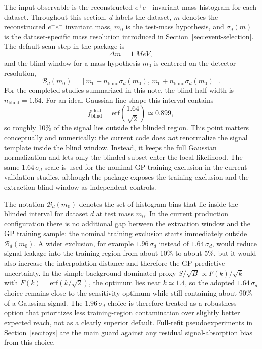 The input observable is the reconstructed $e^+e^-$ invariant-mass histogram for each
dataset. Throughout this section, $d$ labels the dataset, $m$ denotes the reconstructed
$e^+e^-$ invariant mass, $m_0$ is the test-mass hypothesis, and $\sigma_d(m)$ is the
dataset-specific mass resolution introduced in
Section~\ref{sec:event-selection}. The default scan step in the package is
\begin{equation}
\Delta m = \SI{1}{MeV},
\end{equation}
and the blind window for a mass hypothesis $m_0$ is centered on the detector
resolution,
\begin{equation}
\mathcal{B}_d(m_0) =
\left[m_0 - n_{\mathrm{blind}}\sigma_d(m_0),\,
      m_0 + n_{\mathrm{blind}}\sigma_d(m_0)\right].
\end{equation}
For the completed studies summarized in this note, the blind half-width is
$n_{\mathrm{blind}}=1.64$. For an ideal Gaussian line shape this interval contains
\begin{equation}
f_{\mathrm{blind}}^{\mathrm{ideal}}
= \mathrm{erf}\!\left(\frac{1.64}{\sqrt{2}}\right)
\simeq 0.899,
\end{equation}
so roughly 10\% of the signal lies outside the blinded region. This point matters
conceptually and numerically: the current code does \emph{not} renormalize the signal
template inside the blind window. Instead, it keeps the full Gaussian normalization and
lets only the blinded subset enter the local likelihood. The same $1.64\,\sigma_d$
scale is used for the nominal GP training exclusion in the current validation studies,
although the package exposes the training exclusion and the extraction blind window as
independent controls.

The notation $\mathcal{B}_d(m_0)$ denotes the set of histogram bins that lie inside the
blinded interval for dataset $d$ at test mass $m_0$. In the current production
configuration there is no additional gap between the extraction window and the GP
training sample: the nominal training exclusion starts immediately outside
$\mathcal{B}_d(m_0)$. A wider exclusion, for example $1.96\,\sigma_d$ instead of
$1.64\,\sigma_d$, would reduce signal leakage into the training region from about 10\%
to about 5\%, but it would also increase the interpolation distance and therefore the
GP predictive uncertainty. In the simple background-dominated proxy
$S/\sqrt{B}\propto F(k)/\sqrt{k}$ with $F(k)=\mathrm{erf}(k/\sqrt{2})$, the optimum lies
near $k\simeq1.4$, so the adopted $1.64\,\sigma_d$ choice remains close to the
sensitivity optimum while still containing about 90\% of a Gaussian signal. The
$1.96\,\sigma_d$ choice is therefore treated as a robustness option that prioritizes
less training-region contamination over slightly better expected reach, not as a
clearly superior default. Full-refit pseudoexperiments in Section~\ref{sec:toys} are
the main guard against any residual signal-absorption bias from this choice.

